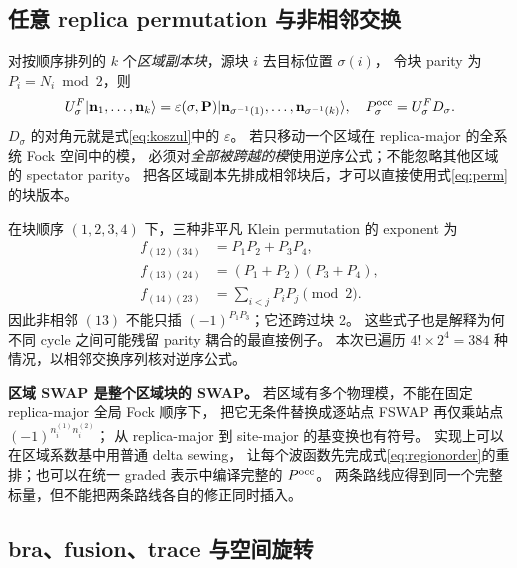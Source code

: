 \documentclass[11pt]{article}
\newcommand{\eps}{\varepsilon}
\begin{document}
\subsection{任意 replica permutation 与非相邻交换}

对按顺序排列的 $k$ 个\emph{区域副本块}，源块 $i$ 去目标位置 $\sigma(i)$，
令块 parity 为 $P_i=N_i\bmod2$，则
\begin{equation}
 U^F_\sigma|\mathbf n_1,\ldots,\mathbf n_k\rangle
 =\eps(\sigma,\mathbf P)|\mathbf n_{\sigma^{-1}(1)},\ldots,
                  \mathbf n_{\sigma^{-1}(k)}\rangle,
 \quad P^{\rm occ}_\sigma=U^F_\sigma D_\sigma.\label{eq:perm}
\end{equation}
$D_\sigma$ 的对角元就是式\eqref{eq:koszul}中的 $\eps$。
若只移动一个区域在 replica-major 的全系统 Fock 空间中的模，
必须对\emph{全部被跨越的模}使用逆序公式；不能忽略其他区域的 spectator parity。
把各区域副本先排成相邻块后，才可以直接使用式\eqref{eq:perm}的块版本。

在块顺序 $(1,2,3,4)$ 下，三种非平凡 Klein permutation 的 exponent 为
\begin{align}
 f_{(12)(34)}&=P_1P_2+P_3P_4,\nonumber\\
 f_{(13)(24)}&=(P_1+P_2)(P_3+P_4),\nonumber\\
 f_{(14)(23)}&=\sum_{i<j}P_iP_j \pmod2.\label{eq:klein}
\end{align}
因此非相邻 $(13)$ 不能只插 $(-1)^{P_1P_3}$；它还跨过块 2。
这些式子也是解释为何不同 cycle 之间可能残留 parity 耦合的最直接例子。
本次已遍历 $4!\times2^4=384$ 种情况，以相邻交换序列核对逆序公式。

\textbf{区域 SWAP 是整个区域块的 SWAP。}
若区域有多个物理模，不能在固定 replica-major 全局 Fock 顺序下，
把它无条件替换成逐站点 FSWAP 再仅乘站点 $(-1)^{n_i^{(1)}n_i^{(2)}}$；
从 replica-major 到 site-major 的基变换也有符号。
实现上可以在区域系数基中用普通 delta sewing，
让每个波函数先完成式\eqref{eq:regionorder}的重排；也可以在统一 graded 表示中编译完整的 $P^{\rm occ}$。
两条路线应得到同一个完整标量，但不能把两条路线各自的修正同时插入。

\subsection{bra、fusion、trace 与空间旋转}
\end{document}

